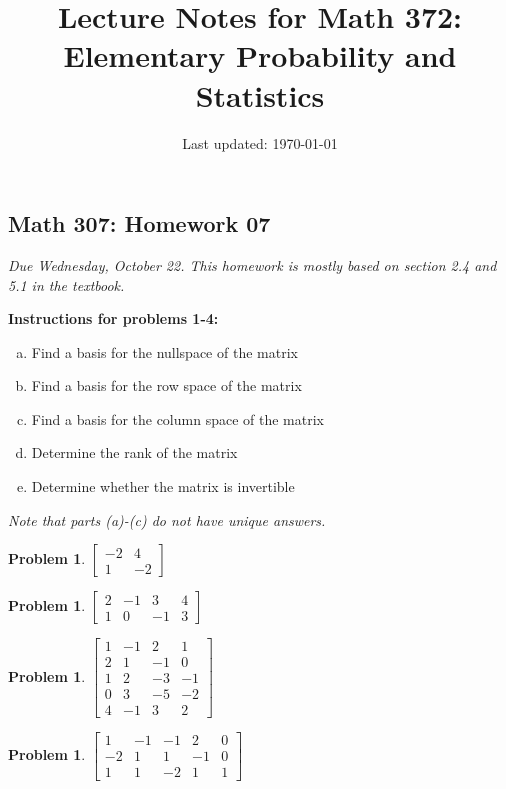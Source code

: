 \documentclass[10pt]{article}
\title{Lecture Notes for Math 372: \\Elementary Probability and Statistics}
\date{Last updated: \today}
\theoremstyle{definition}
\newtheorem{problem}[theorem]{Problem}
\newcommand{\1}[1]{\textbf{1}_{\left[#1\right]}} %
\begin{document}
\begin{center}
  \section*{Math 307: Homework 07}
  \textit{Due Wednesday, October 22. This homework
  is mostly based on section 2.4 and 5.1 in the textbook.}
\end{center}


\noindent \textbf{Instructions for problems 1-4:}
\begin{enumerate}[(a)]
  \item Find a basis for the nullspace of the matrix
  \item Find a basis for the row space of the matrix
  \item Find a basis for the column space of the matrix
  \item Determine the rank of the matrix
  \item Determine whether the matrix is invertible
\end{enumerate}
\textit{Note that parts (a)-(c) do not have unique answers.}


\begin{problem}
  $
  \begin{bmatrix}
    -2&4\\
    1&-2
  \end{bmatrix}
  $
\end{problem}
\begin{problem}
  $
  \begin{bmatrix}
    2&-1&3&4\\
    1&0&-1&3
  \end{bmatrix}
  $
\end{problem}


\begin{problem}
  $
  \begin{bmatrix}
    1&-1&2&1\\
    2&1&-1&0\\
    1&2&-3&-1\\
    0&3&-5&-2\\
    4&-1&3&2
  \end{bmatrix}
  $
\end{problem}


\begin{problem}
  $
  \begin{bmatrix}   
    1&-1&-1&2&0\\
    -2&1&1&-1&0\\
    1&1&-2&1&1
  \end{bmatrix}
  $
\end{problem}
\end{document}

